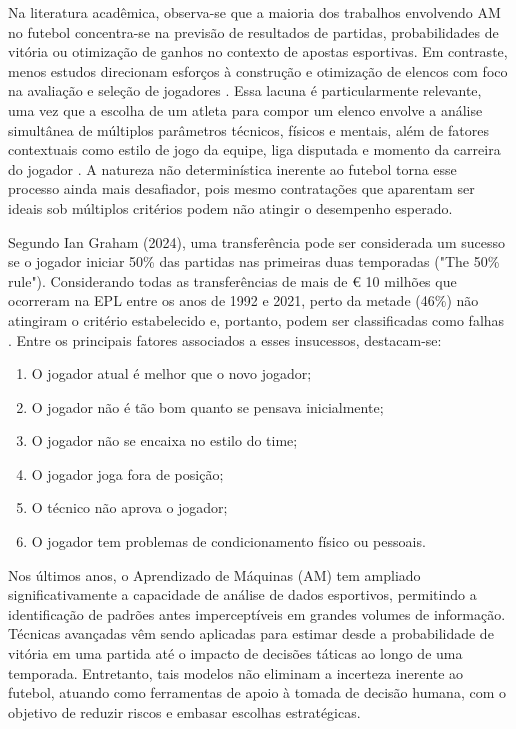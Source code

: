 Na literatura acadêmica, observa-se que a maioria dos trabalhos envolvendo AM no futebol concentra-se na previsão de resultados de partidas, probabilidades de 
vitória ou otimização de ganhos no contexto de apostas esportivas. Em contraste, menos estudos direcionam esforços à construção e otimização de elencos com foco 
na avaliação e seleção de jogadores \cite{Abidin2021}. Essa lacuna é particularmente relevante, uma vez que a escolha de um atleta para compor um elenco envolve 
a análise simultânea de múltiplos parâmetros técnicos, físicos e mentais, além de fatores contextuais como estilo de jogo da equipe, liga disputada e momento da 
carreira do jogador \cite{Abidin2021}. A natureza não determinística inerente ao futebol torna esse processo ainda mais desafiador, pois mesmo contratações que 
aparentam ser ideais sob múltiplos critérios podem não atingir o desempenho esperado.

Segundo Ian Graham (2024), uma transferência pode ser considerada um sucesso se o jogador iniciar 50\% das partidas nas primeiras duas temporadas ("The 50\% rule"). 
Considerando todas as transferências de mais de € 10 milhões que ocorreram na EPL entre os anos de 1992 e 2021, perto da metade (46\%) não atingiram o critério 
estabelecido e, portanto, podem ser classificadas como falhas \cite{Graham2024}. Entre os principais fatores associados a esses insucessos, destacam-se:

\begin{enumerate}
    \item O jogador atual é melhor que o novo jogador;
    \item O jogador não é tão bom quanto se pensava inicialmente;
    \item O jogador não se encaixa no estilo do time;
    \item O jogador joga fora de posição;
    \item O técnico não aprova o jogador;
    \item O jogador tem problemas de condicionamento físico ou pessoais.
\end{enumerate}

Nos últimos anos, o Aprendizado de Máquinas (AM) tem ampliado significativamente a capacidade de análise de dados esportivos, permitindo a identificação de padrões antes 
imperceptíveis em grandes volumes de informação. Técnicas avançadas vêm sendo aplicadas para estimar desde a probabilidade de vitória em uma partida até o impacto de 
decisões táticas ao longo de uma temporada. Entretanto, tais modelos não eliminam a incerteza inerente ao futebol, atuando como ferramentas de apoio à tomada de 
decisão humana, com o objetivo de reduzir riscos e embasar escolhas estratégicas.

